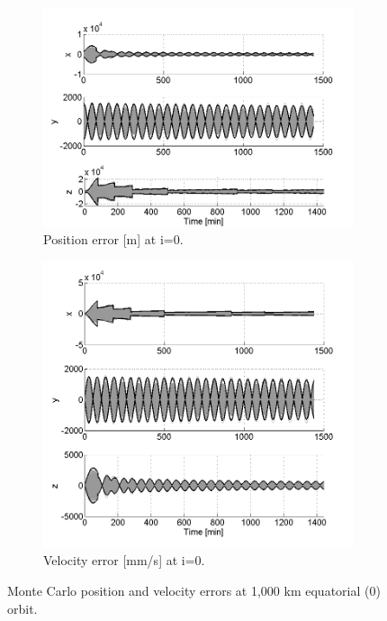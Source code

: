 \documentclass[]{aiaa-tc}%
\begin{document}
\begin{figure}[h!]
\centering
\begin{subfigure}{.49\textwidth}
  \centering
  \includegraphics{MC_pos0}
  \caption{Position error [m] at i=0\degree.}
  \label{fig:mcpos0}
\end{subfigure}
\begin{subfigure}{.49\textwidth} 
  \centering
  \includegraphics{MC_vel0}
  \caption{Velocity error [mm/s] at i=0\degree.}
  \label{fig:coastline}
\end{subfigure}
\caption{Monte Carlo position and velocity errors at 1,000 km equatorial (0\degree) orbit.}
\label{fig:mcvel0}
\end{figure}
\end{document}
